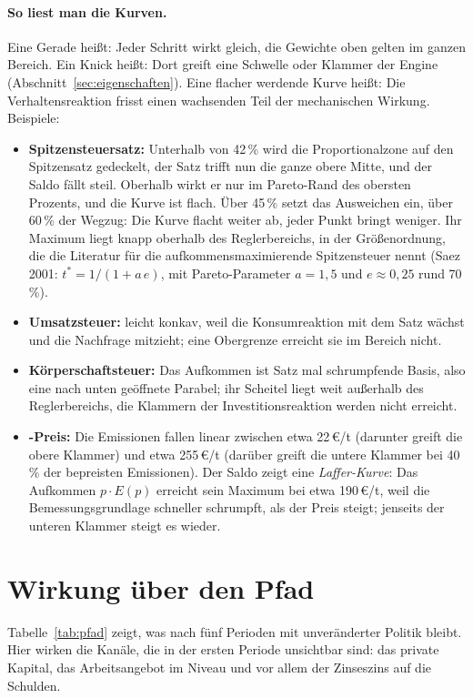 \paragraph{So liest man die Kurven.} Eine Gerade heißt: Jeder Schritt wirkt gleich, die
Gewichte oben gelten im ganzen Bereich. Ein Knick heißt: Dort greift eine Schwelle oder
Klammer der Engine (Abschnitt~\ref{sec:eigenschaften}). Eine flacher werdende Kurve heißt:
Die Verhaltensreaktion frisst einen wachsenden Teil der mechanischen Wirkung. Beispiele:
\begin{itemize}
\item \textbf{Spitzensteuersatz:} Unterhalb von 42\,\% wird die Proportionalzone auf den
  Spitzensatz gedeckelt, der Satz trifft nun die ganze obere Mitte, und der Saldo fällt
  steil. Oberhalb wirkt er nur im Pareto-Rand des obersten Prozents, und die Kurve ist flach.
  Über 45\,\% setzt das Ausweichen ein, über 60\,\% der Wegzug: Die Kurve flacht weiter ab,
  jeder Punkt bringt weniger. Ihr Maximum liegt knapp oberhalb des Reglerbereichs, in der
  Größenordnung, die die Literatur für die aufkommensmaximierende Spitzensteuer nennt
  (Saez 2001: $t^*=1/(1+a\,e)$, mit Pareto-Parameter $a=1{,}5$ und $e\approx0{,}25$ rund
  70\,\%).
\item \textbf{Umsatzsteuer:} leicht konkav, weil die Konsumreaktion mit dem Satz wächst und
  die Nachfrage mitzieht; eine Obergrenze erreicht sie im Bereich nicht.
\item \textbf{Körperschaftsteuer:} Das Aufkommen ist Satz mal schrumpfende Basis, also eine
  nach unten geöffnete Parabel; ihr Scheitel liegt weit außerhalb des Reglerbereichs, die
  Klammern der Investitionsreaktion werden nicht erreicht.
\item \textbf{\COz-Preis:} Die Emissionen fallen linear zwischen etwa 22\,\euro/t (darunter
  greift die obere Klammer) und etwa 255\,\euro/t (darüber greift die untere Klammer bei
  40\,\% der bepreisten Emissionen). Der Saldo zeigt eine \emph{Laffer-Kurve}: Das Aufkommen
  $p\cdot E(p)$ erreicht sein Maximum bei etwa 190\,\euro/t, weil die Bemessungsgrundlage
  schneller schrumpft, als der Preis steigt; jenseits der unteren Klammer steigt es wieder.
\end{itemize}

\section{Wirkung über den Pfad}

Tabelle~\ref{tab:pfad} zeigt, was nach fünf Perioden mit unveränderter Politik bleibt. Hier
wirken die Kanäle, die in der ersten Periode unsichtbar sind: das private Kapital, das
Arbeitsangebot im Niveau und vor allem der Zinseszins auf die Schulden.

